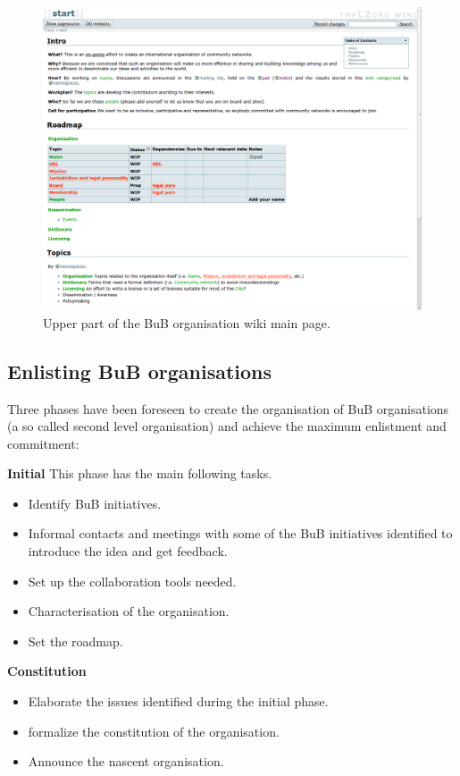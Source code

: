\begin{figure}[H]
  \centering
  \includegraphics[width=0.95\linewidth]{sect2/figures/wiki_l2org.png}
  \caption[BuB organisation wiki]{Upper part of the BuB organisation wiki main page.}
  \label{fig:l2org_wiki}
\end{figure}


\subsection{Enlisting BuB organisations}

Three phases have been foreseen to create the organisation of BuB organisations (a so called second level organisation) and achieve the maximum enlistment and commitment:

\textbf{Initial}
This phase has the main following tasks.
\begin{itemize}
  \setlength{\itemindent}{2em}
  \item Identify BuB initiatives.
  \item Informal contacts and meetings with some of the BuB initiatives identified to introduce the idea and get feedback.
  \item Set up the collaboration tools needed.
  \item Characterisation of the organisation.
  \item Set the roadmap.
\end{itemize}


\textbf{Constitution}
\begin{itemize}
  \setlength{\itemindent}{2em}
  \item Elaborate the issues identified during the initial phase.
  \item formalize the constitution of the organisation.
  \item Announce the nascent organisation.
\end{itemize}


